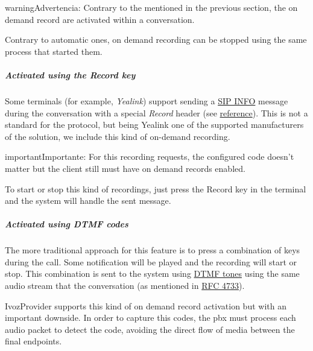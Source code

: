 \documentclass[letterpaper,10pt,spanish]{sphinxmanual}
\begin{document}
\begin{notice}{warning}{Advertencia:}
Contrary to the {\hyperref[administration_portal/platform/services:services]{}} mentioned in the
previous section, the on demand record are activated within a conversation.
\end{notice}

Contrary to automatic ones, on demand recording can be stopped using the same
process that started them.


\subparagraph{Activated using the \emph{Record} key}
\label{administration_portal/client/retail/calls/call_recordings:activated-using-the-record-key}
Some terminals (for example, \emph{Yealink}) support sending a \href{https://tools.ietf.org/html/rfc6086}{SIP INFO} message during the conversation with a
special \emph{Record} header (see \href{http://www.yealink.com/Upload/document/UsingCallRecordingFeatureonYealinkPhones/UsingCallRecordingFeatureonYealinkSIPT2XPphonesRev\_610-20561729764.pdf}{reference}).
This is not a standard for the protocol, but being Yealink one of the supported
manufacturers of the solution, we include this kind of on-demand recording.

\begin{notice}{important}{Importante:}
For this recording requests, the configured code doesn't matter
but the client still must have on demand records enabled.
\end{notice}

To start or stop this kind of recordings, just press the Record key in the
terminal and the system will handle the sent message.


\subparagraph{Activated using \emph{DTMF} codes}
\label{administration_portal/client/retail/calls/call_recordings:activated-using-dtmf-codes}
The more traditional approach for this feature is to press a combination of
keys during the call. Some notification will be played and the recording will
start or stop. This combination is sent to the system using \href{https://es.wikipedia.org/wiki/Marcaci\%C3\%B3n\_por\_tonos}{DTMF tones} using the same audio
stream that the conversation (as mentioned in \href{https://tools.ietf.org/html/rfc4733}{RFC 4733}).

IvozProvider supports this kind of on demand record activation but with an
important downside. In order to capture this codes, the pbx must process each
audio packet to detect the code, avoiding the direct flow of media between the
final endpoints.
\end{document}
